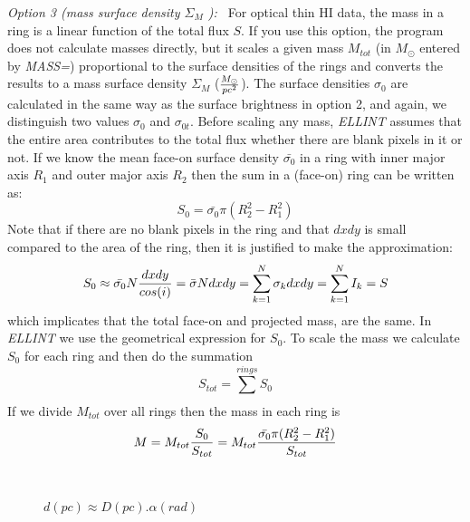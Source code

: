 \noindent      
{\it Option 3 (mass surface density {$\Sigma_M$} ):\ } 
For optical thin HI data, the mass in a ring is a linear function of the total 
flux $S$. If you use this option,  the program does not calculate masses directly, 
but it scales a given mass $M_{tot}$ (in $M_\odot$ entered by {\it MASS=})
proportional to the surface densities of the rings and 
converts the results to a mass surface density $\Sigma_M$ ($M_\odot \over{pc^2}$).
The surface densities $\sigma_{0}$
are calculated in the same way as the surface brightness in option 2, and again,
we distinguish two values $\sigma_{0}$ and $\sigma_{0t}$.
Before scaling any mass, {\it ELLINT} assumes that the entire area contributes to the total flux 
whether there are blank pixels in it or not.
If we know the mean face-on surface density $\bar{\sigma_0}$ in a ring with 
inner major axis $R_{1}$ and outer major axis $R_{2}$ then the sum in 
a (face-on) ring can be written as:
\begin{equation}
S_0 = \bar{\sigma_0} \pi (R_{2}^2-R_{1}^2)
\end{equation}
Note that if there are no blank pixels in the ring and that $dxdy$ is 
small compared to the area of the ring, then it is justified to make the approximation:
$$
S_0 \approx \bar{\sigma_0} N {dxdy\over{cos(i)}} = \bar{\sigma} N dxdy 
= \sum_{k=1}^{N}\sigma_k dxdy = \sum_{k=1}^{N} I_k = S
$$
which implicates that the total face-on and projected mass, are
the same. 
In {\it ELLINT} we use the geometrical expression for $S_0$.
To scale the mass we calculate $S_0$ for each ring 
and then do the summation 
$$S_{tot} = \sum_{}^{rings}S_0$$
If we divide $M_{tot}$  over all rings 
then the mass in each ring is
\begin{equation}
M = M_{tot} {S_0\over{S_{tot}}} =  M_{tot} {\bar{\sigma_0} \pi (R_{2}^2-R_{1}^2)\over{S_{tot}}}
\end{equation}
\begin{figure}
\begin{center}
\leavevmode
\hbox{%
\epsfxsize=2.0in
}
\caption{$d(pc) \approx D(pc).\alpha(rad)$}
\end{center}
\end{figure}

